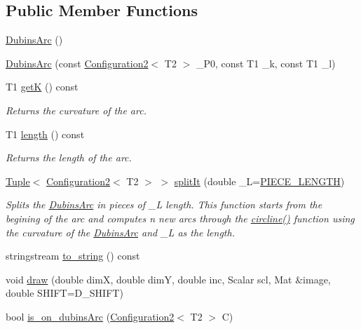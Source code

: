 \subsection*{Public Member Functions}
\begin{DoxyCompactItemize}
\item 
\mbox{\hyperlink{class_dubins_arc_ad09a4671b1b63f630d01b10ef3e48fb0}{Dubins\+Arc}} ()
\item 
\mbox{\hyperlink{class_dubins_arc_a213b0e587638328be1e448869e351475}{Dubins\+Arc}} (const \mbox{\hyperlink{class_configuration2}{Configuration2}}$<$ T2 $>$ \+\_\+\+P0, const T1 \+\_\+k, const T1 \+\_\+l)
\item 
T1 \mbox{\hyperlink{class_dubins_arc_af3fefdb90ba414db3560ef12b329f54a}{getK}} () const
\begin{DoxyCompactList}\small\item\em Returns the curvature of the arc. \end{DoxyCompactList}\item 
T1 \mbox{\hyperlink{class_dubins_arc_a1b0bfacb344d17377f4bda55fdaecae4}{length}} () const
\begin{DoxyCompactList}\small\item\em Returns the length of the arc. \end{DoxyCompactList}\item 
\mbox{\hyperlink{class_tuple}{Tuple}}$<$ \mbox{\hyperlink{class_configuration2}{Configuration2}}$<$ T2 $>$ $>$ \mbox{\hyperlink{class_dubins_arc_af7c6ad3f4c81b2b75c9f439afd9fa746}{split\+It}} (double \+\_\+L=\mbox{\hyperlink{dubins_8hh_a5b2500ca93a5100f73dc442d3cfea7d4}{P\+I\+E\+C\+E\+\_\+\+L\+E\+N\+G\+TH}})
\begin{DoxyCompactList}\small\item\em Splits the {\ttfamily \mbox{\hyperlink{class_dubins_arc}{Dubins\+Arc}}} in pieces of \+\_\+L length. This function starts from the begining of the arc and computes n new arcs through the {\ttfamily \mbox{\hyperlink{dubins_8cc_adef8b363044d7fed558e5b47d8d6a3a0}{circline()}}} function using the curvature of the {\ttfamily \mbox{\hyperlink{class_dubins_arc}{Dubins\+Arc}}} and \+\_\+L as the length. \end{DoxyCompactList}\item 
stringstream \mbox{\hyperlink{class_dubins_arc_aa90c32f88f048e4e17ea79489f44dbfb}{to\+\_\+string}} () const
\item 
void \mbox{\hyperlink{class_dubins_arc_a649ed569e8d8786e54d1553dd6be8dcb}{draw}} (double dimX, double dimY, double inc, Scalar scl, Mat \&image, double S\+H\+I\+FT=D\+\_\+\+S\+H\+I\+FT)
\item 
bool \mbox{\hyperlink{class_dubins_arc_aa92108d7dab38e8ace212d621f9fb8dc}{is\+\_\+on\+\_\+dubins\+Arc}} (\mbox{\hyperlink{class_configuration2}{Configuration2}}$<$ T2 $>$ C)
\end{DoxyCompactItemize}
